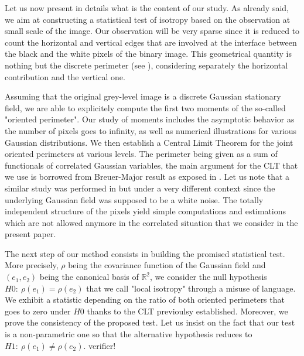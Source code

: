 \documentclass[12pt]{article}
\theoremstyle{Theorem}
\theoremstyle{definition}
\begin{document}
\bigskip

Let us now present in details what is the content of our study. As already said, we aim at constructing a statistical test of isotropy based on the observation at small scale of the image. Our observation will be very sparse since it is reduced to count the horizontal and vertical edges that are involved at the interface between the black and the white pixels of the binary image. This geometrical quantity is nothing but the discrete perimeter (see \cite{HermineAgnes}), considering separately the horizontal contribution and the vertical one. 

Assuming that the original grey-level image is a discrete Gaussian stationary field, we are able to explicitely compute the first two moments of the so-called "oriented perimeter". Our study of moments includes the asymptotic behavior as the number of pixels goes to infinity, as well as numerical illustrations for various Gaussian distributions. We then establish a Central Limit Theorem for the joint oriented perimeters at various levels. The perimeter being given as a sum of functionals of correlated Gaussian variables, the main argument for the CLT that we use is borrowed from Breuer-Major result as exposed in \cite{Arcones}. Let us note that a similar study was performed in \cite{Psymetrie} but under a very different context since the underlying Gaussian field was supposed to be a white noise. The totally independent structure of the pixels yield simple computations and estimations which are not allowed anymore in the correlated situation that we consider in the present paper. 

The next step of our method consists in building the promised statistical test. More precisely, $\rho$ being the covariance function of the Gaussian field and $(e_1,e_2)$ being the canonical basis of $\mathbb R^2$, we consider the null hypothesis $H0:~\rho(e_1)=\rho(e_2)$ that we call "local isotropy" through a misuse of language. We exhibit a statistic depending on the ratio of both oriented perimeters that goes to zero under $H0$ thanks to the CLT previoulsy established. Moreover, we prove the consistency of the proposed test. Let us insist on the fact that our test is a non-parametric one so that the alternative hypothesis reduces to $H1:~\rho(e_1)\ne \rho(e_2)$. {\sc verifier!}
\end{document}
